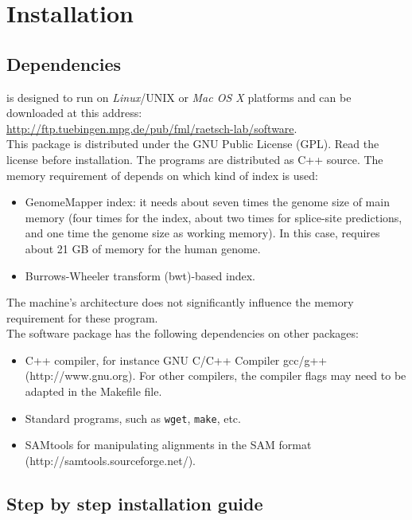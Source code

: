 \documentclass{article}
\begin{document}
\section{Installation}
\label{sec:installation}

\subsection{Dependencies}
\label{sec:dependencies}
\PALMapper{} is designed to run on \emph{Linux}/UNIX or \emph{Mac OS X} platforms and
can be downloaded at this address:\\
\url{http://ftp.tuebingen.mpg.de/pub/fml/raetsch-lab/software}.\\
This package is distributed under the GNU Public License (GPL). Read
the license before installation. The programs are distributed as C++
source. The memory requirement of \PALMapper{} depends on which kind of index is used:
\begin{itemize}
\item GenomeMapper index: it needs about seven times the genome size
  of main memory (four times for the index, about two times for
  splice-site predictions, and one time the genome size as working
  memory). In this case, \PALMapper{} requires about 21 GB of memory
  for the human genome. 
\item Burrows-Wheeler transform (bwt)-based index. %
\end{itemize}
The machine’s architecture does not significantly influence the memory requirement for
these program.\\

The software package has the following dependencies on other packages:
\begin{itemize}
\item C++ compiler, for instance GNU C/C++ Compiler gcc/g++
(http://www.gnu.org). For other compilers, the compiler flags may need to be
adapted in the Makefile file.
\item Standard programs, such as \texttt{wget}, \texttt{make}, etc.
\item SAMtools for manipulating alignments in the SAM format
(http://samtools.sourceforge.net/).
\end{itemize}

\subsection{Step by step installation guide}
\label{sec:installguide}
\end{document}
